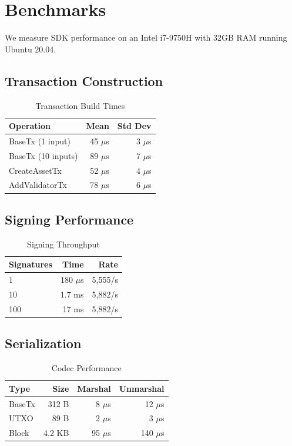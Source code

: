 \documentclass[11pt,twocolumn]{article}
\begin{document}
\section{Benchmarks}

We measure SDK performance on an Intel i7-9750H with 32GB RAM running Ubuntu 20.04.

\subsection{Transaction Construction}

\begin{table}[h]
\centering
\caption{Transaction Build Times}
\begin{tabular}{lrr}
\toprule
\textbf{Operation} & \textbf{Mean} & \textbf{Std Dev} \\
\midrule
BaseTx (1 input) & 45 $\mu$s & 3 $\mu$s \\
BaseTx (10 inputs) & 89 $\mu$s & 7 $\mu$s \\
CreateAssetTx & 52 $\mu$s & 4 $\mu$s \\
AddValidatorTx & 78 $\mu$s & 6 $\mu$s \\
\bottomrule
\end{tabular}
\end{table}

\subsection{Signing Performance}

\begin{table}[h]
\centering
\caption{Signing Throughput}
\begin{tabular}{lrr}
\toprule
\textbf{Signatures} & \textbf{Time} & \textbf{Rate} \\
\midrule
1 & 180 $\mu$s & 5,555/s \\
10 & 1.7 ms & 5,882/s \\
100 & 17 ms & 5,882/s \\
\bottomrule
\end{tabular}
\end{table}

\subsection{Serialization}

\begin{table}[h]
\centering
\caption{Codec Performance}
\begin{tabular}{lrrr}
\toprule
\textbf{Type} & \textbf{Size} & \textbf{Marshal} & \textbf{Unmarshal} \\
\midrule
BaseTx & 312 B & 8 $\mu$s & 12 $\mu$s \\
UTXO & 89 B & 2 $\mu$s & 3 $\mu$s \\
Block & 4.2 KB & 95 $\mu$s & 140 $\mu$s \\
\bottomrule
\end{tabular}
\end{table}
\end{document}
